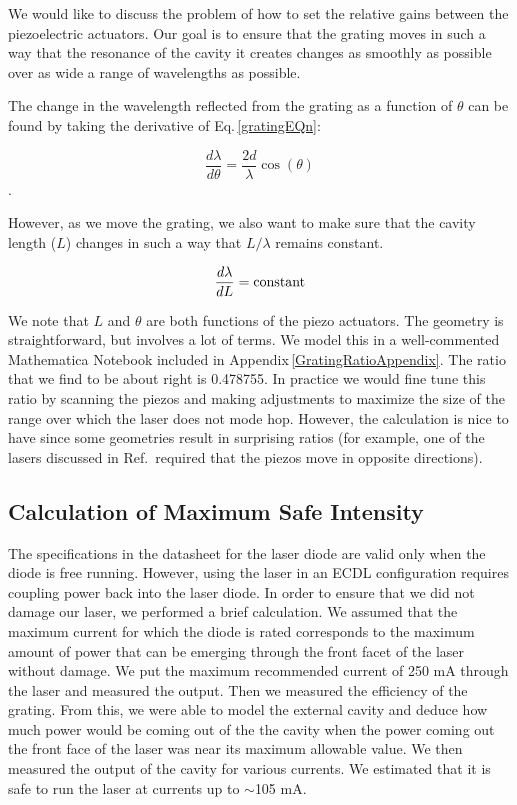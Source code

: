 We would like to discuss the problem of how to set the relative gains between the piezoelectric actuators. Our goal is to ensure that the grating moves in such a way that the resonance of the cavity it creates changes as smoothly as possible over as wide a range of wavelengths as possible. 

The change in the wavelength reflected from the grating as a function of $\theta$ can be found by taking the derivative of Eq.\,\ref{gratingEQn}:

\begin{equation}
    \frac{d\lambda}{d \theta}= \frac{2d}{\lambda} \cos(\theta)
\end{equation}.

However, as we move the grating, we also want to make sure that the cavity length ($L$) changes in such a way that $L/\lambda$ remains constant. 

\begin{equation}
    \frac{d \lambda}{d L}= \textnormal{constant} 
\end{equation}

We note that $L$ and $\theta$ are both functions of the piezo actuators. The geometry is straightforward, but involves a lot of terms. We model this in a well-commented Mathematica Notebook included in Appendix\,\ref{GratingRatioAppendix}. The ratio that we find to be about right is 0.478755. In practice we would fine tune this ratio by scanning the piezos and making adjustments to maximize the size of the range over which the laser does not mode hop. However, the calculation is nice to have since some geometries result in surprising ratios (for example, one of the lasers discussed in Ref.\,\cite{cjeDiss} required that the piezos move in opposite directions).


\subsection{Calculation of Maximum Safe Intensity}

The specifications in the datasheet for the laser diode are valid only when the diode is free running. However, using the laser in an ECDL configuration requires coupling power back into the laser diode. In order to ensure that we did not damage our laser, we performed a brief calculation. We assumed that the maximum current for which the diode is rated corresponds to the maximum amount of power that can be emerging through the front facet of the laser without damage. We put the maximum recommended current of 250 mA through the laser and measured the output. Then we measured the efficiency of the grating. From this, we were able to model the external cavity and deduce how much power would be coming out of the the cavity when the power coming out the front face of the laser was near its maximum allowable value. We then measured the output of the cavity for various currents. We estimated that it is safe to run the laser at currents up to $\sim$105 mA. 

